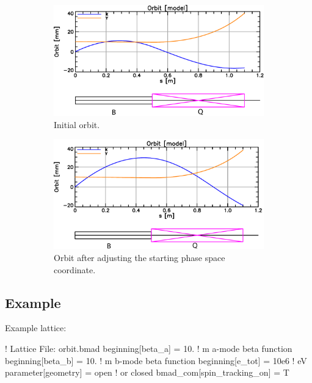 \documentclass{hitec}     %
\begin{document}
{\begin{figure}[tb]
  \centering
  \begin{subfigure}[t]{0.49\textwidth}
    \includegraphics[width=\textwidth]{figures/phase0.pdf}
    \caption{Initial orbit.}
    \label{f:phase0}
  \end{subfigure}
  \hfil
  \begin{subfigure}[t]{0.49\textwidth}
    \includegraphics[width=\textwidth]{figures/phase1.pdf}
    \caption{Orbit after adjusting the starting  phase space coordinate.}
    \label{f:phase1}
  \end{subfigure}
  \caption{}
\end{figure}

\subsection{Example}

Example lattice:
\begin{code}
! Lattice File: orbit.bmad
beginning[beta_a] = 10.   ! m  a-mode beta function
beginning[beta_b] = 10.   ! m  b-mode beta function
beginning[e_tot] = 10e6   ! eV
parameter[geometry] = open  ! or closed
bmad_com[spin_tracking_on] = T


\end{code}}
\end{document}
